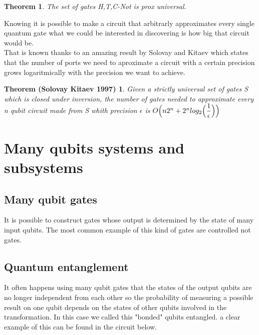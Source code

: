 \documentclass{article}
\newtheorem{Solovay-Kitaev}{Theorem (Solovay Kitaev 1997)}
\newtheorem{Prox-Universal-Set}{Theorem}
\begin{document}
\begin{Prox-Universal-Set}
The set of gates {H,T,C-Not} is prox universal.
\end{Prox-Universal-Set}

Knowing it is possible to make a circuit that arbitrarly approximates
every
single quantum gate what we could be interested in discovering is how
big that circuit would be.\\

That is known thanks to an amazing result by Solovay and Kitaev which
states
that the number of ports we need to aproximate a circuit with a certain
precision grows logaritmically with the precision we want to achieve.

\begin{Solovay-Kitaev}

Given a strictly universal set of gates S which is closed under inversion,
the number of gates needed to approximate every n qubit circuit made
from S whith precision $\epsilon$ is
$O\Bigl(n2^n+2^nlog_2 \Bigl( \dfrac{1}{\epsilon}\Bigl)\Bigl)$


\end{Solovay-Kitaev}


\newpage

\section{Many qubits systems and subsystems}



\subsection{Many qubit gates}
It is possible to construct gates whose output is determined by the state
of many input qubits.
The most common example of this kind of gates are controlled not gates.


\subsection{Quantum entanglement}

It often happens using many qubit gates that the states of the output
qubits are no longer independent from each other so the probability
of measuring a possible result on one qubit depends on the states of
other qubits involved in the transformation.
In this case we called this "bonded" qubits entangled.
a clear example of this can be found in the circuit below.\\
\end{document}
